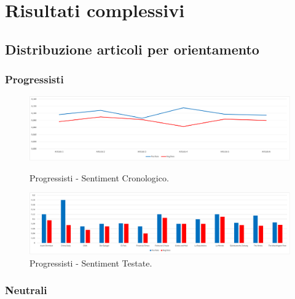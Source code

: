 \chapter{Risultati complessivi}

\section{Distribuzione articoli per orientamento}

\subsection{Progressisti}

\begin{figure}[H]
    \centering
    \includegraphics[width=1\linewidth]{Immagini/Progressisti/Progressisti - Sentiment Cronologico.png}
    \caption{Progressisti - Sentiment Cronologico.}
    \label{fig:enter-label-a5}

    \centering
    \includegraphics[width=1\linewidth]{Immagini/Progressisti/Progressisti - Sentiment Testate.png}
    \caption{Progressisti - Sentiment Testate.}
    \label{fig:enter-label-a5}
\end{figure}

\newpage
\subsection{Neutrali}

